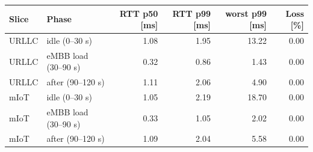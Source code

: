 \begin{tabular}{llrrrr}
\toprule
Slice & Phase & RTT p50 [ms] & RTT p99 [ms] & worst p99 [ms] & Loss [\%] \\
\midrule
URLLC & idle (0–30 s) & 1.08 & 1.95 & 13.22 & 0.00 \\
URLLC & eMBB load (30–90 s) & 0.32 & 0.86 & 1.43 & 0.00 \\
URLLC & after (90–120 s) & 1.11 & 2.06 & 4.90 & 0.00 \\
mIoT & idle (0–30 s) & 1.05 & 2.19 & 18.70 & 0.00 \\
mIoT & eMBB load (30–90 s) & 0.33 & 1.05 & 2.02 & 0.00 \\
mIoT & after (90–120 s) & 1.09 & 2.04 & 5.58 & 0.00 \\
\bottomrule
\end{tabular}
